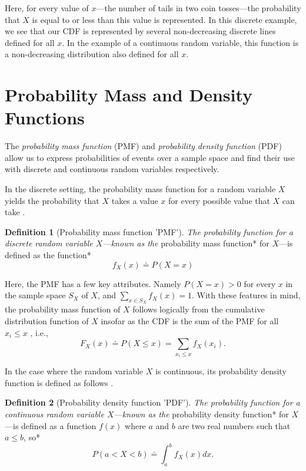 \documentclass[
  12pt,
  twoside]{book}
\theoremstyle{definition}
\newtheorem{definition}{Definition}[chapter]
\theoremstyle{definition}
\theoremstyle{definition}
\theoremstyle{remark}
\begin{document}
Here, for every value of \(x\)---the number of tails in two coin tosses---the probability that \(X\) is equal to or less than this value is represented.
In this discrete example, we see that our CDF is represented by several non-decreasing discrete lines defined for all \(x\).
In the example of a continuous random variable, this function is a non-decreasing distribution also defined for all \(x\).

\hypertarget{probability-mass-and-density-functions}{%
\section{Probability Mass and Density Functions}\label{probability-mass-and-density-functions}}

The \emph{probability mass function} (PMF) and \emph{probability density function} (PDF) allow us to express probabilities of events over a sample space and find their use with discrete and continuous random variables respectively.

In the discrete setting, the probability mass function for a random variable \(X\) yields the probability that \(X\) takes a value \(x\) for every possible value that \(X\) can take \citep[  2.2]{Wasserman2004}.

\begin{definition}[Probability mass function 'PMF']
\protect\hypertarget{def:pmf}{}{\label{def:pmf} {} }\emph{The probability function for a discrete random variable \(X\)---known as the }probability mass function* for \(X\)---is defined as the function*
\[f_{X}(x) \doteq P(X=x)\]
\end{definition}

Here, the PMF has a few key attributes.
Namely \(P(X=x)>0\) for every \(x\) in the sample space \(S_{X}\) of \(X\), and \(\sum_{x \in S_{X}}f_{X}(x)=1\).
With these features in mind, the probability mass function of \(X\) follows logically from the cumulative distribution function of \(X\) insofar as the CDF is the sum of the PMF for all \(x_{i}≤x\) \citep[  2.2]{Wasserman2004}, i.e., \[F_{X}(x) \doteq P(X≤x)=\sum_{x_i≤x}f_{X}(x_{i}).\]

In the case where the random variable \(X\) is continuous, its probability density function is defined as follows \citep[  2.2]{Wasserman2004}.

\begin{definition}[Probability density function 'PDF']
\protect\hypertarget{def:pdf}{}{\label{def:pdf} {} }\emph{The probability function for a continuous random variable \(X\)---known as the }probability density function* for \(X\)---is defined as a function \(f(x)\) where \(a\) and \(b\) are two real numbers such that \(a ≤ b\), so*
\[P(a<X<b) \doteq \int_{a}^{b}f_X(x)dx.\]
\end{definition}
\end{document}
